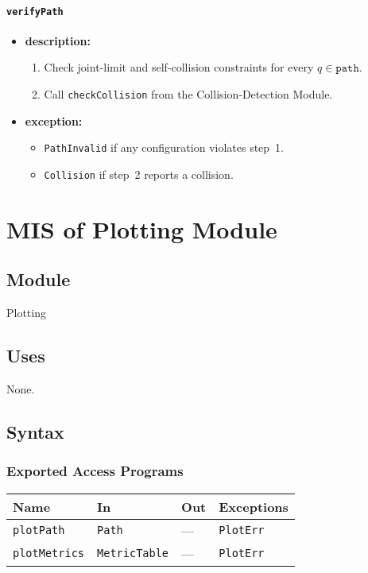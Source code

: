 \documentclass[12pt, titlepage]{article}
\begin{document}
\paragraph{\texttt{verifyPath}}
\begin{itemize}
  \item \textbf{description:}
        \begin{enumerate}
          \item Check joint‑limit and self‑collision constraints for every $q\in\texttt{path}$.
          \item Call \texttt{checkCollision} from the Collision‑Detection Module.
        \end{enumerate}
  \item \textbf{exception:}
        \begin{itemize}
          \item \texttt{PathInvalid} if any configuration violates step 1.
          \item \texttt{Collision} if step 2 reports a collision.
        \end{itemize}
\end{itemize}


\newpage
\section{MIS of Plotting Module}
\label{mod:plot}

\subsection{Module}
Plotting

\subsection{Uses}
None.

\subsection{Syntax}
\subsubsection{Exported Access Programs}
\begin{center}
\renewcommand{\arraystretch}{1.3}
\begin{tabular}{p{3.2cm} p{6cm} p{3cm} p{3cm}}
\toprule
\textbf{Name} & \textbf{In} & \textbf{Out} & \textbf{Exceptions}\\ \midrule
\texttt{plotPath}    & \texttt{Path} & --- & \texttt{PlotErr}\\
\texttt{plotMetrics} & \texttt{MetricTable} & --- & \texttt{PlotErr}\\
\bottomrule
\end{tabular}
\end{center}
\end{document}
